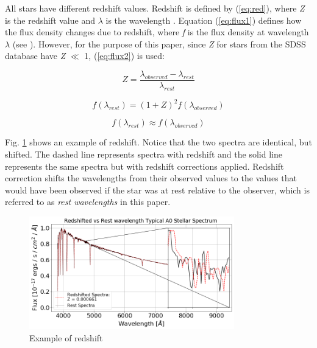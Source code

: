 \documentclass[conference]{IEEEtran}
\begin{document}
All stars have different redshift values. Redshift is defined by (\ref{eq:red}), where \textit{Z} is the redshift value and $\lambda$ is the wavelength \cite{Carroll, Chromey}. Equation (\ref{eq:flux1})  defines how the flux density changes due to redshift, where \textit{f} is the flux density at wavelength $\lambda$ (see \cite{Chromey}). However, for the purpose of this paper, since \textit{Z} for stars from the SDSS database have \textit{Z} $\ll$ 1, (\ref{eq:flux2}) is used: 
        
        \begin{equation}\label{eq:red}
            Z = \frac{\lambda_{observed} - \lambda_{rest}}{\lambda_{rest}}
        \end{equation}

        \begin{equation}\label{eq:flux1}
            f(\lambda_{rest}) = (1 + Z)^2 f(\lambda_{observed}) 
        \end{equation}

        \begin{equation}\label{eq:flux2}
            f(\lambda_{rest}) \approx f(\lambda_{observed})
        \end{equation}


 Fig. \ref{fig:redshift} shows an example of redshift. Notice that the two spectra are identical, but shifted. The dashed line represents spectra with redshift and the solid line represents the same spectra but with redshift corrections applied. Redshift correction shifts the wavelengths from their observed values to the values that would have been observed if the star was at rest relative to the observer, which is referred to as \textit{rest wavelengths} in this paper. 

        \begin{figure}
            \centering
            \includegraphics[width=3.5in]{redshift.png}
            \caption{Example of redshift}
            \label{fig:redshift}
        \end{figure}
\end{document}
